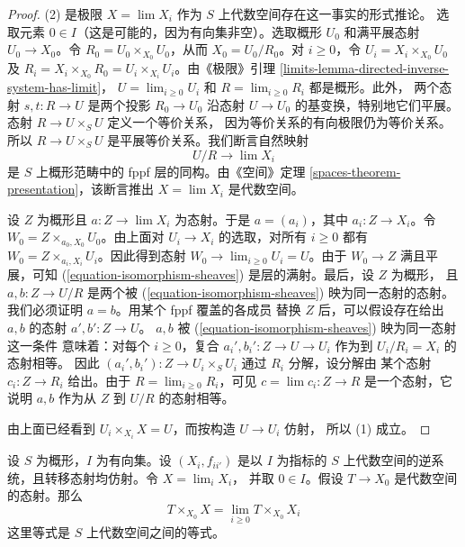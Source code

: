 \begin{proof}
(2) 是极限 $X=\lim X_i$ 作为 $S$ 上代数空间存在这一事实的形式推论。
选取元素 $0\in I$（这是可能的，因为有向集非空）。选取概形 $U_0$
和满平展态射 $U_0\to X_0$。令 $R_0=U_0\times_{X_0}U_0$，从而
$X_0=U_0/R_0$。对 $i\geq0$，令 $U_i=X_i\times_{X_0}U_0$ 及
$R_i=X_i\times_{X_0}R_0=U_i\times_{X_i}U_i$。由《极限》引理
\ref{limits-lemma-directed-inverse-system-has-limit}，
$U=\lim_{i\geq0}U_i$ 和 $R=\lim_{i\geq0}R_i$ 都是概形。此外，
两个态射 $s,t:R\to U$ 是两个投影 $R_0\to U_0$ 沿态射 $U\to U_0$
的基变换，特别地它们平展。态射 $R\to U\times_SU$ 定义一个等价关系，
因为等价关系的有向极限仍为等价关系。%
所以 $R\to U\times_SU$ 是平展等价关系。我们断言自然映射
\begin{equation}
\label{equation-isomorphism-sheaves}
U/R \longrightarrow \lim X_i
\end{equation}
是 $S$ 上概形范畴中的 fppf 层的同构。由《空间》定理
\ref{spaces-theorem-presentation}，该断言推出 $X=\lim X_i$ 是代数空间。

\medskip\noindent
设 $Z$ 为概形且 $a:Z\to\lim X_i$ 为态射。于是 $a=(a_i)$，其中
$a_i:Z\to X_i$。令 $W_0=Z\times_{a_0,X_0}U_0$。由上面对
$U_i\to X_i$ 的选取，对所有 $i\geq0$ 都有
$W_0=Z\times_{a_i,X_i}U_i$。因此得到态射
$W_0\to\lim_{i\geq0}U_i=U$。由于 $W_0\to Z$ 满且平展，可知
(\ref{equation-isomorphism-sheaves}) 是层的满射。最后，设 $Z$ 为概形，
且 $a,b:Z\to U/R$ 是两个被 (\ref{equation-isomorphism-sheaves})
映为同一态射的态射。我们必须证明 $a=b$。用某个 fppf 覆盖的各成员
替换 $Z$ 后，可以假设存在给出 $a,b$ 的态射 $a',b':Z\to U$。
$a,b$ 被 (\ref{equation-isomorphism-sheaves}) 映为同一态射这一条件
意味着：对每个 $i\geq0$，复合
$a_i',b_i':Z\to U\to U_i$ 作为到 $U_i/R_i=X_i$ 的态射相等。
因此 $(a_i',b_i'):Z\to U_i\times_SU_i$ 通过 $R_i$ 分解，设分解由
某个态射 $c_i:Z\to R_i$ 给出。由于 $R=\lim_{i\geq0}R_i$，可见
$c=\lim c_i:Z\to R$ 是一个态射，它说明 $a,b$ 作为从 $Z$ 到
$U/R$ 的态射相等。

\medskip\noindent
由上面已经看到 $U_i\times_{X_i}X=U$，而按构造 $U\to U_i$ 仿射，
所以 (1) 成立。
\end{proof}

\begin{lemma}
\label{lemma-space-over-limit}
设 $S$ 为概形，$I$ 为有向集。设 $(X_i,f_{ii'})$ 是以 $I$ 为指标的
$S$ 上代数空间的逆系统，且转移态射均仿射。令 $X=\lim_iX_i$，
并取 $0\in I$。假设 $T\to X_0$ 是代数空间的态射。那么
$$
T \times_{X_0} X = \lim_{i \geq 0} T \times_{X_0} X_i
$$
这里等式是 $S$ 上代数空间之间的等式。
\end{lemma}

